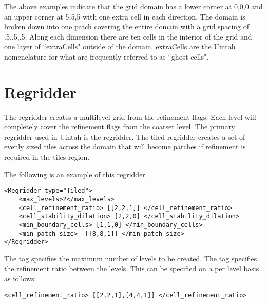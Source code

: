 The above examples indicate that the grid domain has a lower corner at
0,0,0 and an upper corner at 5,5,5 with one extra cell in each
direction.  The domain is broken down into one patch covering the
entire domain with a grid spacing of .5,.5,.5.  Along each dimension
there are ten cells in the interior of the grid and one layer of
``extraCells" outside of the domain.  extraCells are the Uintah nomenclature
for what are frequently referred to as ``ghost-cells".

%
%


\section{Regridder}

The regridder creates a multilevel grid from the refinement flags.
Each level will completely cover the refinement flags from the coarser
level.  The primary regridder used in Uintah is the  regridder.
The tiled regridder creates a set of evenly sized tiles across the domain
that will become patches if refinement is required in the tiles region.

The following is an example of this regridder.

\begin{Verbatim}[fontsize=\footnotesize]
<Regridder type="Tiled">   
    <max_levels>2</max_levels>
    <cell_refinement_ratio> [[2,2,1]] </cell_refinement_ratio>
    <cell_stability_dilation> [2,2,0] </cell_stability_dilation>
    <min_boundary_cells> [1,1,0] </min_boundary_cells>
    <min_patch_size>  [[8,8,1]] </min_patch_size>
</Regridder>
\end{Verbatim}

The  tag specifies the maximum number of levels
to be created.  The  tag specifies the 
refinement ratio between the levels.  This can be specified on a per 
level basis as follows:

\begin{Verbatim}[fontsize=\footnotesize]
    <cell_refinement_ratio> [[2,2,1],[4,4,1]] </cell_refinement_ratio>
\end{Verbatim}

